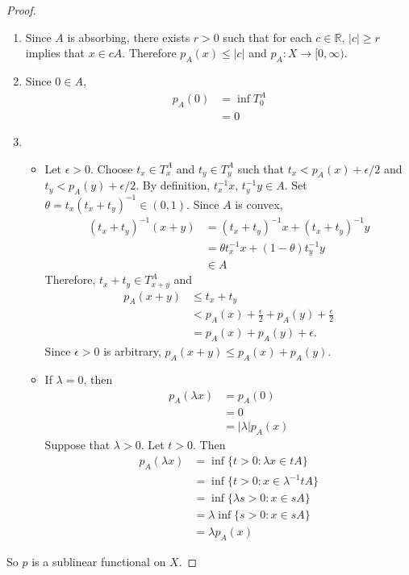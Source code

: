 \documentclass[12pt]{amsart}
\theoremstyle{definition}
\newcommand{\lam}{\lambda}
\newcommand{\ep}{\epsilon}
\newcommand{\R}{\mathbb{R}}
\newcommand{\Rg}{[0,\infty)}
\DeclareMathOperator*{\0}{\mbf{0}}
\DeclareMathOperator*{\1}{\mbf{1}}
\begin{document}
	\begin{proof}\
		\begin{enumerate}
			\item Since $A$ is absorbing, there exists $r >0$ such that for each $c \in \R$, $|c| \geq r$ implies that $x \in cA$. Therefore $p_A(x) \leq |c|$ and $p_A: X \rightarrow \Rg$.
			\item Since $0 \in A$, 
			\begin{align*}
				p_A(0) 
				&= \inf T^A_0 \\
				&= 0
			\end{align*}
			\item \begin{itemize}
				\item Let $\ep >0$. Choose $t_x \in T^A_x$ and $t_y \in T^A_y$ such that $t_x < p_A(x) + \ep/2$ and $t_y < p_A(y) + \ep/2$. By definition, $t_x^{-1}x$, $t_y^{-1}y \in A$. Set $\theta = t_x(t_x +t_y)^{-1} \in (0, 1)$. Since $A$ is convex, 
				\begin{align*}
					(t_x +t_y)^{-1}(x+y) 
					&= (t_x +t_y)^{-1}x + (t_x +t_y)^{-1}y \\
					&= \theta t_x^{-1}x + (1 - \theta)t_y^{-1}y \\
					& \in A
				\end{align*}
				Therefore, $t_x + t_y \in T^A_{x+y}$ and 
				\begin{align*}
					p_A(x+y) 
					& \leq t_x + t_y \\
					& < p_A(x) + \frac{\ep}{2} + p_A(y) + \frac{\ep}{2} \\
					& = p_A(x) + p_A(y) + \ep.
				\end{align*}
				Since $\ep >0$ is arbitrary, $p_A(x+y) \leq p_A(x) + p_A(y)$.
				\item If $\lam =0$, then 
				\begin{align*}
					p_A(\lam x) 
					&= p_A(0) \\
					&= 0 \\
					&= |\lam| p_A(x)
				\end{align*}
				Suppose that $\lam > 0$. Let $t >0$. Then
				\begin{align*}
					p_A(\lam x) 
					&= \inf \{t > 0: \lam x \in tA\} \\
					&= \inf \{t > 0: x \in \lam^{-1} tA\} \\
					&= \inf \{\lam s > 0: x \in sA\} \\
					&= \lam \inf \{ s > 0: x \in sA\} \\
					&= \lam p_A(x)
				\end{align*}
			\end{itemize}
		\end{enumerate}
		So $p$ is a sublinear functional on $X$. 
	\end{proof}
\end{document}
